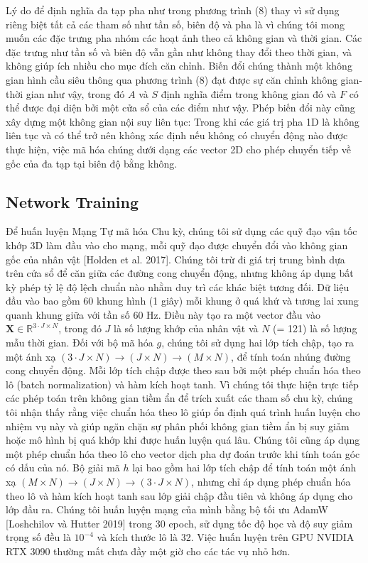 Lý do để định nghĩa đa tạp pha như trong phương trình (8) thay vì sử dụng riêng biệt tất cả các tham số như tần số, biên độ và pha là vì chúng tôi mong muốn các đặc trưng pha nhóm các hoạt ảnh theo cả không gian và thời gian. Các đặc trưng như tần số và biên độ vẫn gần như không thay đổi theo thời gian, và không giúp ích nhiều cho mục đích căn chỉnh. Biến đổi chúng thành một không gian hình cầu siêu thông qua phương trình (8) đạt được sự căn chỉnh không gian-thời gian như vậy, trong đó $A$ và $S$ định nghĩa điểm trong không gian đó và $F$ có thể được đại diện bởi một cửa sổ của các điểm như vậy. Phép biến đổi này cũng xây dựng một không gian nội suy liên tục: Trong khi các giá trị pha 1D là không liên tục và có thể trở nên không xác định nếu không có chuyển động nào được thực hiện, việc mã hóa chúng dưới dạng các vector 2D cho phép chuyển tiếp về gốc của đa tạp tại biên độ bằng không.

\subsection{Network Training}

Để huấn luyện Mạng Tự mã hóa Chu kỳ, chúng tôi sử dụng các quỹ đạo vận tốc khớp 3D làm đầu vào cho mạng, mỗi quỹ đạo được chuyển đổi vào không gian gốc của nhân vật [Holden et al. 2017]. Chúng tôi trừ đi giá trị trung bình dựa trên cửa sổ để căn giữa các đường cong chuyển động, nhưng không áp dụng bất kỳ phép tỷ lệ độ lệch chuẩn nào nhằm duy trì các khác biệt tương đối. Dữ liệu đầu vào bao gồm 60 khung hình (1 giây) mỗi khung ở quá khứ và tương lai xung quanh khung giữa với tần số 60 Hz. Điều này tạo ra một vector đầu vào $\textbf{X} \in \mathbb{R}^{3 \cdot J \times N}$, trong đó $J$ là số lượng khớp của nhân vật và $N$ (= 121) là số lượng mẫu thời gian.
Đối với bộ mã hóa $g$, chúng tôi sử dụng hai lớp tích chập, tạo ra một ánh xạ $(3 \cdot J \times N) \to (J \times N) \to (M \times N)$, để tính toán nhúng đường cong chuyển động. Mỗi lớp tích chập được theo sau bởi một phép chuẩn hóa theo lô (batch normalization) và hàm kích hoạt tanh. Vì chúng tôi thực hiện trực tiếp các phép toán trên không gian tiềm ẩn để trích xuất các tham số chu kỳ, chúng tôi nhận thấy rằng việc chuẩn hóa theo lô giúp ổn định quá trình huấn luyện cho nhiệm vụ này và giúp ngăn chặn sự phân phối không gian tiềm ẩn bị suy giảm hoặc mô hình bị quá khớp khi được huấn luyện quá lâu. Chúng tôi cũng áp dụng một phép chuẩn hóa theo lô cho vector dịch pha dự đoán trước khi tính toán góc có dấu của nó. Bộ giải mã $h$ lại bao gồm hai lớp tích chập để tính toán một ánh xạ $(M \times N) \to (J \times N) \to (3 \cdot J \times N)$, nhưng chỉ áp dụng phép chuẩn hóa theo lô và hàm kích hoạt tanh sau lớp giải chập đầu tiên và không áp dụng cho lớp đầu ra. Chúng tôi huấn luyện mạng của mình bằng bộ tối ưu AdamW [Loshchilov và Hutter 2019] trong 30 epoch, sử dụng tốc độ học và độ suy giảm trọng số đều là $10^{-4}$ và kích thước lô là 32. Việc huấn luyện trên GPU NVIDIA RTX 3090 thường mất chưa đầy một giờ cho các tác vụ nhỏ hơn.


